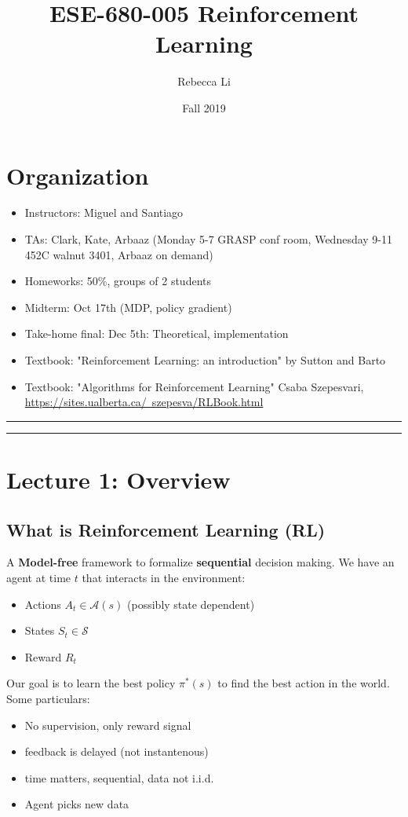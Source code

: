 \documentclass{article}
\title{ESE-680-005 Reinforcement Learning}
\author{Rebecca Li}
\date{Fall 2019}
\theoremstyle{definition}
\newcommand{\Section}[1]{\hrule\hrule\section{#1}}
\begin{document}
	\maketitle

\section*{Organization}
\begin{itemize}
	\item Instructors: Miguel and Santiago 
	\item TAs: Clark, Kate, Arbaaz (Monday 5-7 GRASP conf room, Wednesday 9-11 452C walnut 3401, Arbaaz on demand)
	\item Homeworks: 50\%, groups of 2 students
	\item Midterm: Oct 17th (MDP, policy gradient)
	\item Take-home final: Dec 5th: Theoretical, implementation
	\item Textbook: "Reinforcement Learning: an introduction" by Sutton and Barto
	\item Textbook: "Algorithms for Reinforcement Learning" Csaba Szepesvari, \\
		\href{https://sites.ualberta.ca/~szepesva/RLBook.html}{https://sites.ualberta.ca/~szepesva/RLBook.html}
\end{itemize}	


\Section{Lecture 1: Overview}
\subsection{What is Reinforcement Learning (RL)}
A \textbf{Model-free} framework to formalize \textbf{sequential} decision making. We have an agent at time $t$ that interacts in the environment:
\begin{itemize}
	\item Actions $A_t \in \mathcal{A}(s)$  (possibly state dependent)
	\item States $S_t \in \mathcal{S}$
	\item Reward $R_t$
\end{itemize}

Our goal is to learn the best policy $\pi^*(s)$ to find the best action in the world. 
Some particulars:
\begin{itemize}
	\item No supervision, only reward signal
	\item feedback is delayed (not instantenous)
	\item time matters, sequential, data not i.i.d.
	\item Agent picks new data
\end{itemize}
\end{document}
